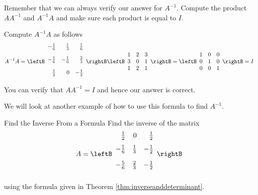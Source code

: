 \begin{solution}
Remember that we can always verify our answer for $A^{-1}$. Compute the product $AA^{-1}$ and $A^{-1}A$ and make
sure each product is equal to $I$.

Compute $A^{-1}A$ as follows
\begin{equation*}
A^{-1}A = 
\allowbreak \leftB
\begin{array}{rrr}
-\vspace{0.05in}\frac{1}{6} & \vspace{0.05in}\frac{1}{3} & \vspace{0.05in}
\frac{1}{6} \\
-\vspace{0.05in}\frac{1}{6} & -\vspace{0.05in}\frac{1}{6} & \vspace{0.05in}
\frac{2}{3} \\
\vspace{0.05in}\frac{1}{2} & 0 & -\vspace{0.05in}\frac{1}{2}
\end{array}
\rightB \leftB
\begin{array}{rrr}
1 & 2 & 3 \\
3 & 0 & 1 \\
1 & 2 & 1
\end{array}
\rightB = \leftB
\begin{array}{rrr}
1 & 0 & 0 \\
0 & 1 & 0 \\
0 & 0 & 1
\end{array}
\rightB
=
I
\end{equation*}
You can verify that $AA^{-1} = I$ and hence our answer is correct. 
\end{solution} 

We will look at another example of how to use this formula to find $A^{-1}$.

\begin{example}{Find the Inverse From a Formula}\label{exa:inverseformula}
Find the inverse of the matrix
\begin{equation*}
A=\leftB
\begin{array}{rrr}
\vspace{0.05in}\frac{1}{2} & 0 & \vspace{0.05in}\frac{1}{2} \\
-\vspace{0.05in}\frac{1}{6} & \vspace{0.05in}\frac{1}{3} & -\vspace{0.05in}
\frac{1}{2} \\
-\vspace{0.05in}\frac{5}{6} & \vspace{0.05in}\frac{2}{3} & -\vspace{0.05in}
\frac{1}{2}
\end{array}
\rightB
\end{equation*}
using the formula given in Theorem \ref{thm:inverseanddeterminant}.
\end{example}

